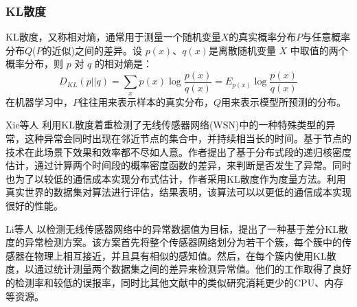 



\subsubsection{KL散度}
KL散度，又称相对熵，通常用于测量一个随机变量$X$的真实概率分布$P$与任意概率分布$Q$($P$的近似)之间的差异。设 $p(x)$、$q(x)$是离散随机变量 $X$ 中取值的两个概率分布，则 $p$ 对 $q$ 的相对熵是：
\begin{equation}
    D_{KL}(p||q) = \sum_x p(x) \log \frac{p(x)}{q(x)} = E_{p(x)} \log \frac{p(x)}{q(x)}
\end{equation}
在机器学习中，$P$往往用来表示样本的真实分布，$Q$用来表示模型所预测的分布。


Xie等人\cite{xie2016distributed} 利用KL散度着重检测了无线传感器网络(WSN)中的一种特殊类型的异常，这种异常会同时出现在邻近节点的集合中，并持续相当长的时间。基于节点的技术在此场景下效果和效率都不尽如人意。作者提出了基于分布式段的递归核密度估计，通过计算两个时间段的概率密度函数的差异，来判断是否发生了异常。同时也为了以较低的通信成本实现分布式估计，作者采用KL散度作为度量方法。利用真实世界的数据集对算法进行评估，结果表明，该算法可以以更低的通信成本实现很好的性能。

Li等人\cite{li2012differential} 以检测无线传感器网络中的异常数据值为目标，提出了一种基于差分KL散度的异常检测方案。该方案首先将整个传感器网络划分为若干个簇，每个簇中的传感器在物理上相互接近，并且具有相似的感知值。然后，在每个簇内使用KL散度，以通过统计测量两个数据集之间的差异来检测异常值。他们的工作取得了良好的检测率和较低的误报率，同时比其他文献中的类似研究消耗更少的CPU、内存等资源。




